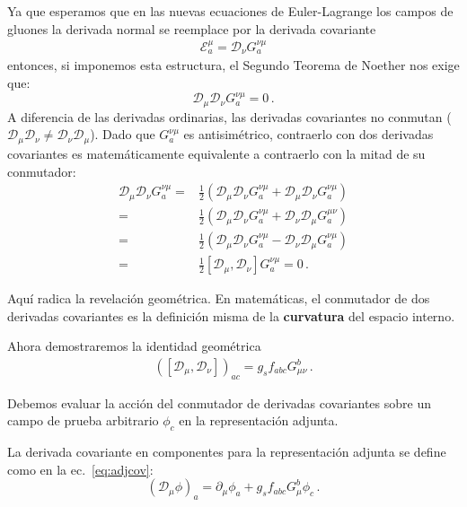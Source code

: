 Ya que esperamos que en las nuevas ecuaciones de Euler-Lagrange los campos de gluones la derivada normal se reemplace por la derivada covariante
\begin{align}
  \mathcal{E}_{a}^\mu = \mathcal{D}_\nu G^{\nu\mu}_a 
\end{align}
entonces, si imponemos esta estructura, el Segundo Teorema de Noether nos exige que:
\begin{equation}
    \mathcal{D}_\mu \mathcal{D}_\nu G^{\nu\mu}_a = 0 \, .
\end{equation}
A diferencia de las derivadas ordinarias, las derivadas covariantes no conmutan ($\mathcal{D}_\mu \mathcal{D}_\nu \neq \mathcal{D}_\nu \mathcal{D}_\mu$). Dado que $G^{\nu\mu}_a$ es antisimétrico, contraerlo con dos derivadas covariantes es matemáticamente equivalente a contraerlo con la mitad de su conmutador:
\begin{align}
  \mathcal{D}_\mu \mathcal{D}_\nu G^{\nu\mu}_a 
  =& \frac{1}{2}\left(   \mathcal{D}_\mu \mathcal{D}_\nu G^{\nu\mu}_a +  \mathcal{D}_\mu \mathcal{D}_\nu G^{\nu\mu}_a\right) \nonumber\\
  =& \frac{1}{2}\left(   \mathcal{D}_\mu \mathcal{D}_\nu G^{\nu\mu}_a +  \mathcal{D}_\nu \mathcal{D}_\mu G^{\mu\nu}_a\right) \nonumber\\
    =& \frac{1}{2}\left(   \mathcal{D}_\mu \mathcal{D}_\nu G^{\nu\mu}_a -  \mathcal{D}_\nu \mathcal{D}_\mu G^{\nu\mu}_a\right) \nonumber\\
=&  \frac{1}{2} [\mathcal{D}_\mu, \mathcal{D}_\nu] G^{\nu\mu}_a = 0 \, .
    \label{eq:conmutador_noether}
\end{align}

Aquí radica la revelación geométrica. En matemáticas, el conmutador de dos derivadas covariantes es la definición misma de la \textbf{curvatura} del espacio interno. 



Ahora demostraremos  la identidad geométrica
\begin{align}
  ([\mathcal{D}_\mu, \mathcal{D}_\nu])_{ac} = g_s f_{abc} G_{\mu\nu}^b\,.
\end{align}

Debemos evaluar la acción del conmutador de derivadas covariantes sobre un campo de prueba arbitrario $\phi_c$ en la representación adjunta.

La derivada covariante en componentes para la representación adjunta se define como en la ec.~\eqref{eq:adjcov}:
\begin{equation}
    (\mathcal{D}_\mu \phi)_a = \partial_\mu \phi_a + g_s f_{abc} G_\mu^b \phi_c \, .
    \label{eq:derivada_adj_comp}
\end{equation}

